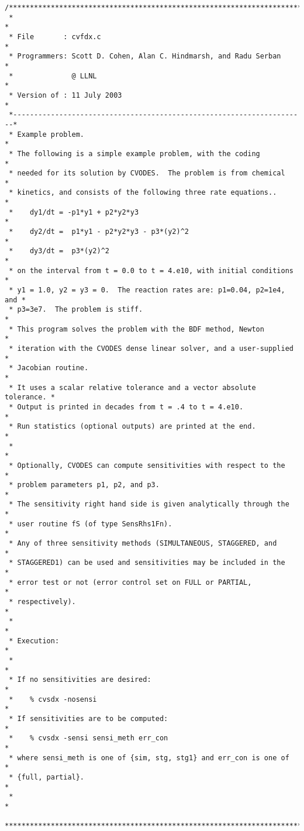 \begin{verbatim}
/************************************************************************
 *                                                                      *
 * File       : cvfdx.c                                                 *
 * Programmers: Scott D. Cohen, Alan C. Hindmarsh, and Radu Serban      * 
 *              @ LLNL                                                  *
 * Version of : 11 July 2003                                            *
 *----------------------------------------------------------------------*
 * Example problem.                                                     *
 * The following is a simple example problem, with the coding           *
 * needed for its solution by CVODES.  The problem is from chemical     *
 * kinetics, and consists of the following three rate equations..       *
 *    dy1/dt = -p1*y1 + p2*y2*y3                                        *
 *    dy2/dt =  p1*y1 - p2*y2*y3 - p3*(y2)^2                            *
 *    dy3/dt =  p3*(y2)^2                                               *
 * on the interval from t = 0.0 to t = 4.e10, with initial conditions   *
 * y1 = 1.0, y2 = y3 = 0.  The reaction rates are: p1=0.04, p2=1e4, and *
 * p3=3e7.  The problem is stiff.                                       *
 * This program solves the problem with the BDF method, Newton          *
 * iteration with the CVODES dense linear solver, and a user-supplied   *
 * Jacobian routine.                                                    * 
 * It uses a scalar relative tolerance and a vector absolute tolerance. *
 * Output is printed in decades from t = .4 to t = 4.e10.               *
 * Run statistics (optional outputs) are printed at the end.            *
 *                                                                      *
 * Optionally, CVODES can compute sensitivities with respect to the     *
 * problem parameters p1, p2, and p3.                                   *
 * The sensitivity right hand side is given analytically through the    *
 * user routine fS (of type SensRhs1Fn).                                *
 * Any of three sensitivity methods (SIMULTANEOUS, STAGGERED, and       *
 * STAGGERED1) can be used and sensitivities may be included in the     *
 * error test or not (error control set on FULL or PARTIAL,             *
 * respectively).                                                       *
 *                                                                      *
 * Execution:                                                           *
 *                                                                      *
 * If no sensitivities are desired:                                     *
 *    % cvsdx -nosensi                                                  *
 * If sensitivities are to be computed:                                 *
 *    % cvsdx -sensi sensi_meth err_con                                 *
 * where sensi_meth is one of {sim, stg, stg1} and err_con is one of    *
 * {full, partial}.                                                     * 
 *                                                                      *
 ************************************************************************/


\end{verbatim}
